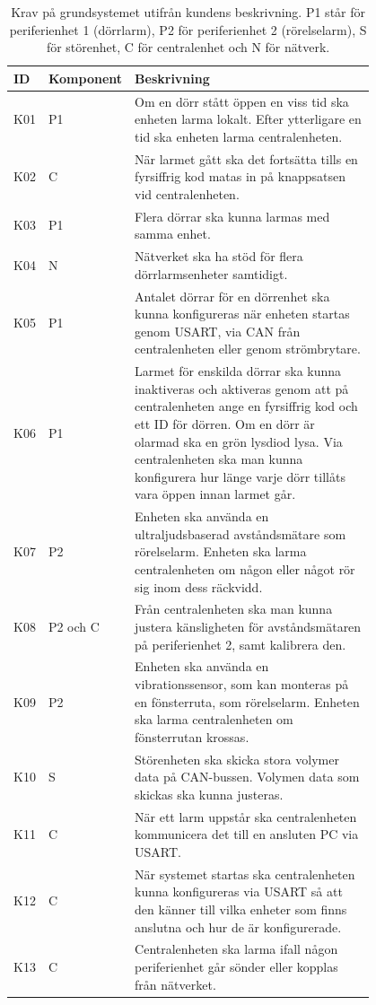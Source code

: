 \documentclass[a4paper]{article}
\begin{document}
\begin{table}[h]
\centering
\begin{tabular}{| l | l | p{0.8\linewidth}|}
\hline
\textbf{ID} & \textbf{Komponent} & \textbf{Beskrivning} \\ \hline
K01 & P1 & Om en dörr stått öppen en viss tid ska enheten larma lokalt. Efter ytterligare en tid ska enheten larma centralenheten. \\ \hline
K02 & C & När larmet gått ska det fortsätta tills en fyrsiffrig kod matas in på knappsatsen vid centralenheten. \\ \hline
K03 & P1 & Flera dörrar ska kunna larmas med samma enhet. \\ \hline
K04 & N & Nätverket ska ha stöd för flera dörrlarmsenheter samtidigt. \\ \hline
K05 & P1 & Antalet dörrar för en dörrenhet ska kunna konfigureras när enheten startas genom  USART,  via  CAN  från  centralenheten  eller genom strömbrytare. \\ \hline
K06 & P1 & Larmet för enskilda dörrar ska kunna inaktiveras och aktiveras genom att på centralenheten ange en fyrsiffrig kod och ett ID för dörren. Om en dörr är olarmad ska en grön lysdiod lysa. Via centralenheten ska man kunna konfigurera hur länge varje dörr tillåts vara öppen innan larmet går. \\ \hline
K07 & P2 & Enheten ska använda en ultraljudsbaserad avståndsmätare som rörelselarm. Enheten ska larma centralenheten om någon eller något rör sig inom dess räckvidd. \\ \hline
K08 & P2 och C & Från  centralenheten  ska  man  kunna  justera  känsligheten  för avståndsmätaren på periferienhet 2, samt kalibrera den. \\ \hline
K09 & P2 & Enheten ska använda en vibrationssensor, som kan monteras på en fönsterruta, som rörelselarm. Enheten ska larma centralenheten om fönsterrutan krossas. \\ \hline
K10 & S & Störenheten ska skicka stora volymer data på CAN-bussen. Volymen data som skickas ska kunna justeras. \\ \hline
K11 & C & När ett larm uppstår ska centralenheten kommunicera det till en ansluten PC via  USART. \\ \hline
K12 & C & När  systemet  startas  ska  centralenheten  kunna  konfigureras  via  USART  så  att  den känner till vilka enheter som finns anslutna och hur de är konfigurerade. \\ \hline
K13 & C & Centralenheten ska larma ifall någon periferienhet går sönder eller kopplas från nätverket. \\ \hline
\end{tabular}
\caption{Krav på grundsystemet utifrån kundens beskrivning. P1 står för periferienhet 1 (dörrlarm), P2 för periferienhet 2 (rörelselarm), S för störenhet, C för centralenhet och N för nätverk.}
\label{tabell:krav}
\end{table}
\end{document}
